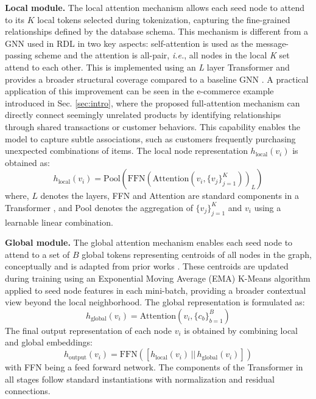 \documentclass{article} %
\begin{document}
\textbf{Local module.} The local attention mechanism allows each seed node to attend to its $K$ local tokens selected during tokenization, capturing the fine-grained relationships defined by the database schema. This 
mechanism 
is different from a GNN used in RDL \citep{robinson2025relbench} in two key aspects: self-attention is used as the message-passing scheme and the attention is all-pair, \textit{i.e.}, all nodes in the local \textit{K} set attend to each other. This is implemented using an \textit{L} layer Transformer 
\citep{vaswani2017attention} and provides a broader structural coverage compared to a baseline GNN \citep{robinson2025relbench}. A practical application of this improvement can be seen in the e-commerce example introduced in Sec. \ref{sec:intro}, where the proposed full-attention mechanism can directly connect seemingly unrelated products by identifying relationships through shared transactions or customer behaviors. This capability enables the model to capture subtle associations, such as customers frequently purchasing unexpected combinations of items.
The local node representation $h_{\text{local}}(v_i)$ is obtained as:
\begin{equation}
    h_{\text{local}}(v_i) = \text{Pool}( \text{FFN}(\text{Attention}(v_i, \{v_j\}_{j=1}^{K}))_L )
\end{equation}
where, $L$ denotes the layers, FFN and Attention are standard components in a Transformer \citep{vaswani2017attention}, and Pool denotes the aggregation of $\{v_j\}_{j=1}^{K}$ and $v_i$ using a learnable linear combination.

\textbf{Global module.} The global attention mechanism enables each seed node to attend to a set of $B$ global tokens representing centroids of all nodes in the graph, conceptually and is adapted from prior works \citep{kong2023goat, dwivedi2023graph}. These centroids are updated during training using an Exponential Moving Average (EMA) K-Means algorithm applied to seed node features in each mini-batch, providing a broader contextual view beyond the local neighborhood. 
The global representation is formulated as:
\begin{equation}
    h_{\text{global}}(v_i) = \text{Attention}(v_i, \{c_b\}_{b=1}^{B})
\end{equation}
The final output representation of each node $v_i$ is obtained by combining local and global embeddings:
\begin{equation}
    h_{\text{output}}(v_i) = \text{FFN} ([h_{\text{local}}(v_i) \, || \, h_{\text{global}}(v_i)])
\end{equation}
with FFN being a feed forward network.
The components of the Transformer in all stages follow standard instantiations with normalization and residual connections. 
\end{document}
